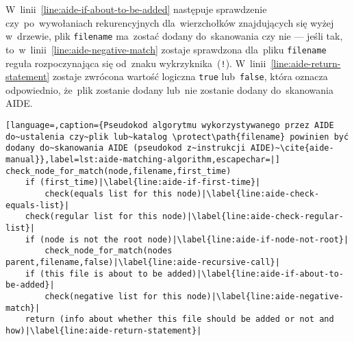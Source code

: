 \documentclass[thesis]{subfiles}
\begin{document}
W~linii~\ref{line:aide-if-about-to-be-added} następuje sprawdzenie czy~po~wywołaniach rekurencyjnych dla~wierzchołków znajdujących się wyżej w~drzewie, plik \texttt{filename} ma~zostać dodany do~skanowania czy nie --- jeśli tak, to~w~linii~\ref{line:aide-negative-match} zostaje sprawdzona dla~pliku \texttt{filename} reguła rozpoczynająca się od~znaku wykrzyknika~(\texttt{!}). W~linii~\ref{line:aide-return-statement} zostaje zwrócona wartość logiczna \texttt{true} lub~\texttt{false}, która oznacza odpowiednio, że~plik zostanie dodany lub~nie zostanie dodany do~skanowania AIDE.

\begin{lstlisting}[language=,caption={Pseudokod algorytmu wykorzystywanego przez AIDE do~ustalenia czy~plik lub~katalog \protect\path{filename} powinien być dodany do~skanowania AIDE (pseudokod z~instrukcji AIDE)~\cite{aide-manual}},label=lst:aide-matching-algorithm,escapechar=|]
check_node_for_match(node,filename,first_time)
    if (first_time)|\label{line:aide-if-first-time}|
        check(equals list for this node)|\label{line:aide-check-equals-list}|
    check(regular list for this node)|\label{line:aide-check-regular-list}|
    if (node is not the root node)|\label{line:aide-if-node-not-root}|
        check_node_for_match(nodes parent,filename,false)|\label{line:aide-recursive-call}|
    if (this file is about to be added)|\label{line:aide-if-about-to-be-added}|
        check(negative list for this node)|\label{line:aide-negative-match}|
    return (info about whether this file should be added or not and how)|\label{line:aide-return-statement}|
\end{lstlisting}
\end{document}
